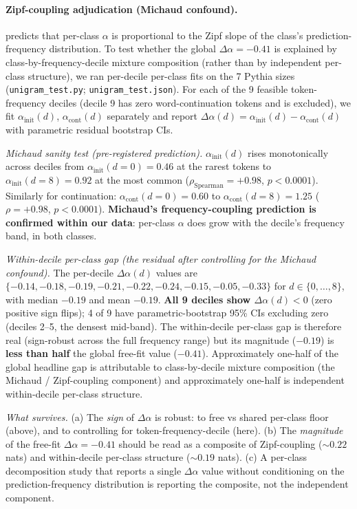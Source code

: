 \documentclass[10pt]{article}
\newcommand{\dalpha}{\Delta\alpha}
\begin{document}
\paragraph{Zipf-coupling adjudication (Michaud confound).}
\citet{michaud2023quantization} predicts that per-class $\alpha$ is
proportional to the Zipf slope of the class's prediction-frequency
distribution. To test whether the global $\dalpha = -0.41$ is
explained by class-by-frequency-decile mixture composition (rather
than by independent per-class structure), we ran per-decile per-class
fits on the 7 Pythia sizes (\texttt{unigram\_test.py};
\texttt{unigram\_test.json}). For each of the 9 feasible
token-frequency deciles (decile 9 has zero word-continuation tokens
and is excluded), we fit $\alpha_\mathrm{init}(d)$, $\alpha_\mathrm{cont}(d)$ separately and
report $\dalpha(d) = \alpha_\mathrm{init}(d) - \alpha_\mathrm{cont}(d)$ with parametric
residual bootstrap CIs.

\textit{Michaud sanity test (pre-registered prediction).}
$\alpha_\mathrm{init}(d)$ rises monotonically across deciles from
$\alpha_\mathrm{init}(d{=}0) = 0.46$ at the rarest tokens to
$\alpha_\mathrm{init}(d{=}8) = 0.92$ at the most common
($\rho_\mathrm{Spearman} = +0.98$, $p < 0.0001$). Similarly for
continuation: $\alpha_\mathrm{cont}(d{=}0) = 0.60$ to $\alpha_\mathrm{cont}(d{=}8) = 1.25$
($\rho = +0.98$, $p < 0.0001$). \textbf{Michaud's
frequency-coupling prediction is confirmed within our data}: per-class
$\alpha$ does grow with the decile's frequency band, in both classes.

\textit{Within-decile per-class gap (the residual after controlling
for the Michaud confound).} The per-decile $\dalpha(d)$ values are
$\{-0.14, -0.18, -0.19, -0.21, -0.22, -0.24, -0.15, -0.05, -0.33\}$
for $d \in \{0, \ldots, 8\}$, with median $-0.19$ and mean $-0.19$.
\textbf{All 9 deciles show $\dalpha(d) < 0$} (zero positive sign
flips); 4 of 9 have parametric-bootstrap 95\% CIs excluding zero
(deciles 2--5, the densest mid-band). The within-decile per-class
gap is therefore real (sign-robust across the full frequency range)
but its magnitude ($-0.19$) is \textbf{less than half} the global
free-fit value ($-0.41$). Approximately one-half of the global
headline gap is attributable to class-by-decile mixture composition
(the Michaud / Zipf-coupling component) and approximately one-half
is independent within-decile per-class structure.

\textit{What survives.} (a) The \emph{sign} of $\dalpha$ is robust:
to free vs shared per-class floor (above), and to controlling for
token-frequency-decile (here). (b) The \emph{magnitude} of the
free-fit $\dalpha = -0.41$ should be read as a composite of
Zipf-coupling ($\sim$$0.22$ nats) and within-decile per-class
structure ($\sim$$0.19$ nats). (c) A per-class decomposition study
that reports a single $\dalpha$ value without conditioning on the
prediction-frequency distribution is reporting the composite, not the
independent component.
\end{document}

